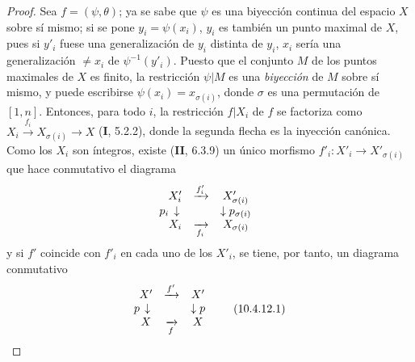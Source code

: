\begin{proof}
Sea $f=(\psi,\theta)$; ya se sabe
{} que $\psi$ es una
biyección continua del espacio $X$ sobre sí mismo; si se pone
$y_i=\psi(x_i)$, $y_i$ es también un punto maximal de $X$, pues si $y'_i$
fuese una generalización de $y_i$ distinta de $y_i$, $x_i$ sería una
generalización $\neq x_i$ de $\psi^{-1}(y'_i)$. Puesto que el conjunto $M$
de los puntos maximales de $X$ es finito, la restricción $\psi|M$ es una
\emph{biyección} de $M$ sobre sí mismo, y puede escribirse
$\psi(x_i)=x_{\sigma(i)}$, donde $\sigma$ es una permutación de
$[1,n]$. Entonces, para todo $i$, la restricción $f|X_i$ de $f$ se
factoriza como
$X_i\xrightarrow{f_i}X_{\sigma(i)}\longrightarrow X$
(\textbf I, 5.2.2), donde la segunda flecha es la inyección canónica. Como los
$X_i$ son íntegros, existe (\textbf{II}, 6.3.9) un único morfismo
$f'_i:X'_i\to X'_{\sigma(i)}$ que hace conmutativo el diagrama
\[
\begin{array}{ccc}
X'_i&\xrightarrow{f'_i}&X'_{\sigma(i)}\\
\llap{$p_i$\,}\downarrow&&\downarrow p_{\sigma(i)}\\
X_i&\xrightarrow[f_i]{}&X_{\sigma(i)}
\end{array}
\]
y si $f'$ coincide con $f'_i$ en cada uno de los $X'_i$, se tiene, por tanto, un
diagrama conmutativo
\label{IV.10.4.12.1}
\begin{equation}
\label{IV.10.4.12.1.errata}
\begin{array}{ccc}
X'&\xrightarrow{f'}&X'\\
\llap{$p$\,}\downarrow&&\downarrow p\\
X&\xrightarrow[f]{}&X
\end{array}
\tag{10.4.12.1}
\end{equation}


\end{proof}
